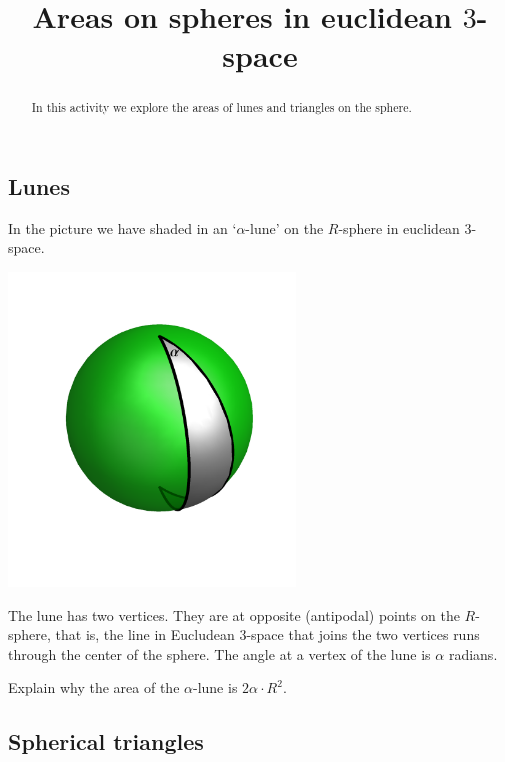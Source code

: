 \documentclass{ximera}
\title{Areas on spheres in euclidean $3$-space}
\begin{document}
\begin{abstract}
In this activity we explore the areas of lunes and triangles on the sphere.
\end{abstract}
\maketitle




\subsection*{Lunes}

In the picture we have shaded in an `$\alpha$-lune' on the $R$-sphere in
euclidean $3$-space.%
\begin{image}
\includegraphics[width=3in]{W13_3.png}%
\end{image}


The lune has two vertices. They are at opposite (antipodal) points on the
$R$-sphere, that is, the line in Eucludean $3$-space that joins the two
vertices runs through the center of the sphere. The angle at a vertex of the
lune is $\alpha$ radians.

\begin{exercise}
\label{67} Explain why the area of the $\alpha$-lune is $2\alpha
\cdot R^{2}$.
\end{exercise}


\subsection*{Spherical triangles}
\end{document}
